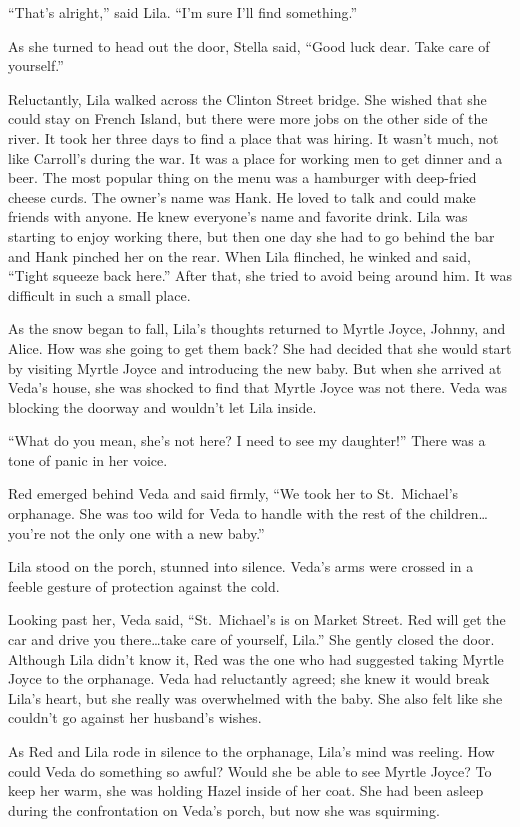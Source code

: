 \documentclass[
  american,
  letterpaper,
]{book}
\begin{document}
``That's alright,'' said Lila. ``I'm sure I'll find something.''

As she turned to head out the door, Stella said, ``Good luck dear. Take
care of yourself.''

Reluctantly, Lila walked across the Clinton Street bridge. She wished
that she could stay on French Island, but there were more jobs on the
other side of the river. It took her three days to find a place that was
hiring. It wasn't much, not like Carroll's during the war. It was a
place for working men to get dinner and a beer. The most popular thing
on the menu was a hamburger with deep-fried cheese curds. The owner's
name was Hank. He loved to talk and could make friends with anyone. He
knew everyone's name and favorite drink. Lila was starting to enjoy
working there, but then one day she had to go behind the bar and Hank
pinched her on the rear. When Lila flinched, he winked and said, ``Tight
squeeze back here.'' After that, she tried to avoid being around him. It
was difficult in such a small place.

As the snow began to fall, Lila's thoughts returned to Myrtle Joyce,
Johnny, and Alice. How was she going to get them back? She had decided
that she would start by visiting Myrtle Joyce and introducing the new
baby. But when she arrived at Veda's house, she was shocked to find that
Myrtle Joyce was not there. Veda was blocking the doorway and wouldn't
let Lila inside.

``What do you mean, she's not here? I need to see my daughter!'' There
was a tone of panic in her voice.

Red emerged behind Veda and said firmly, ``We took her to St.~Michael's
orphanage. She was too wild for Veda to handle with the rest of the
children\ldots you're not the only one with a new baby.''

Lila stood on the porch, stunned into silence. Veda's arms were crossed
in a feeble gesture of protection against the cold.

Looking past her, Veda said, ``St.~Michael's is on Market Street. Red
will get the car and drive you there\ldots take care of yourself,
Lila.'' She gently closed the door. Although Lila didn't know it, Red
was the one who had suggested taking Myrtle Joyce to the orphanage. Veda
had reluctantly agreed; she knew it would break Lila's heart, but she
really was overwhelmed with the baby. She also felt like she couldn't go
against her husband's wishes.

As Red and Lila rode in silence to the orphanage, Lila's mind was
reeling. How could Veda do something so awful? Would she be able to see
Myrtle Joyce? To keep her warm, she was holding Hazel inside of her
coat. She had been asleep during the confrontation on Veda's porch, but
now she was squirming.
\end{document}

